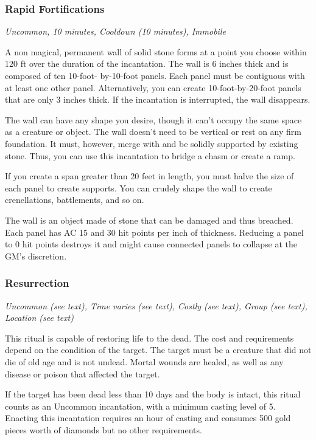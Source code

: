 \subsubsection{Rapid Fortifications}
\textit{Uncommon, 10 minutes, Cooldown (10 minutes), Immobile}

A non magical, permanent wall of solid stone forms at a point you choose within 120 ft over the duration of the incantation. The wall is 6 inches thick and is composed of ten 10-foot- by-10-foot panels. Each panel must be contiguous with at least one other panel. Alternatively, you can create 10-foot-by-20-foot panels that are only 3 inches thick. If the incantation is interrupted, the wall disappears.

The wall can have any shape you desire, though it can't occupy the same space as a creature or object. The wall doesn't need to be vertical or rest on any firm foundation. It must, however, merge with and be solidly supported by existing stone. Thus, you can use this incantation to bridge a chasm or create a ramp.

If you create a span greater than 20 feet in length, you must halve the size of each panel to create supports. You can crudely shape the wall to create crenellations, battlements, and so on.

The wall is an object made of stone that can be damaged and thus breached. Each panel has AC 15 and 30 hit points per inch of thickness. Reducing a panel to 0 hit points destroys it and might cause connected panels to collapse at the GM's discretion.

\subsubsection{Resurrection\label{inc:resurrection}}
\textit{Uncommon (see text), Time varies (see text), Costly (see text), Group (see text), Location (see text)}

This ritual is capable of restoring life to the dead. The cost and requirements depend on the condition of the target. The target must be a creature that did not die of old age and is not undead. Mortal wounds are healed, as well as any disease or poison that affected the target.

If the target has been dead less than 10 days and the body is intact, this ritual counts as an Uncommon incantation, with a minimum casting level of 5. Enacting this incantation requires an hour of casting and consumes 500 gold pieces worth of diamonds but no other requirements.

